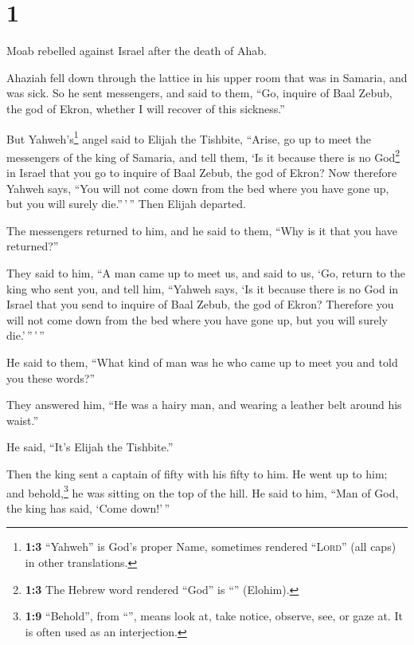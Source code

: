 \hypertarget{section}{%
\section{1}\label{section}}

 Moab rebelled against Israel after the death of Ahab.

 Ahaziah fell down through the lattice in his upper room
that was in Samaria, and was sick. So he sent messengers, and said to
them, ``Go, inquire of Baal Zebub, the god of Ekron, whether I will
recover of this sickness.''

 But Yahweh's\footnote{\textbf{1:3} ``Yahweh'' is God's
  proper Name, sometimes rendered ``\textsc{Lord}'' (all caps) in other
  translations.} angel said to Elijah the Tishbite, ``Arise, go up to
meet the messengers of the king of Samaria, and tell them, `Is it
because there is no God\footnote{\textbf{1:3} The Hebrew word rendered
  ``God'' is ``'' (Elohim).} in Israel that you go to
inquire of Baal Zebub, the god of Ekron?  Now therefore
Yahweh says, ``You will not come down from the bed where you have gone
up, but you will surely die.''\,'\,'' Then Elijah departed.

 The messengers returned to him, and he said to them,
``Why is it that you have returned?''

 They said to him, ``A man came up to meet us, and said to
us, `Go, return to the king who sent you, and tell him, ``Yahweh says,
`Is it because there is no God in Israel that you send to inquire of
Baal Zebub, the god of Ekron? Therefore you will not come down from the
bed where you have gone up, but you will surely die.'\,''\,'\,''

 He said to them, ``What kind of man was he who came up to
meet you and told you these words?''

 They answered him, ``He was a hairy man, and wearing a
leather belt around his waist.''

He said, ``It's Elijah the Tishbite.''

 Then the king sent a captain of fifty with his fifty to
him. He went up to him; and behold,\footnote{\textbf{1:9} ``Behold'',
  from ``'', means look at, take notice, observe, see, or
  gaze at. It is often used as an interjection.} he was sitting on the
top of the hill. He said to him, ``Man of God, the king has said, `Come
down!'\,''

